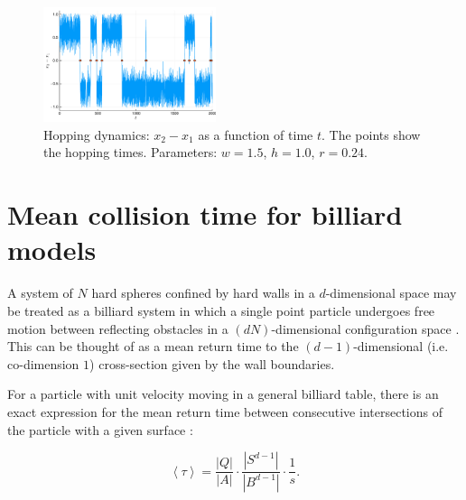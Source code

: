\documentclass[superscriptaddress,pre,reprint,showpacs,twocolumn]{revtex4-1}
\newcommand{\mean}[1]{\left \langle #1 \right \rangle}
\begin{document}
\begin{figure}[h]
  \begin{center}
    \includegraphics[width=0.45\textwidth]{figures/bistable.pdf}
  \end{center}
  \caption{Hopping dynamics: $x_2 - x_1$ as a function of time $t$. The points show the hopping times. Parameters:  $w = 1.5$, $h = 1.0$, $r = 0.24$.
  \label{fig:hopping-dynamics}  
    }
\end{figure}



\section{Mean collision time for billiard models}

\label{knownfacts}

A system of $N$ hard spheres confined by hard walls in a $d$-dimensional
space may be treated as a billiard system 
in which a single point particle undergoes free motion between reflecting obstacles 
in a $ (d N) $-dimensional configuration space \cite{Sinai70, Sim99, MarkChern}. 
This can be thought of as a mean return time to the $(d-1)$-dimensional 
(i.e. co-dimension $1$) cross-section given by the wall boundaries.

For a particle with unit velocity moving in a general billiard table, there is 
an exact expression for the mean return time between consecutive
intersections of the particle with a given surface \cite{Chernov97}:

\begin{equation}\label{meanfreetime}
 \mean{\tau} = \frac{|Q|}{|A|} \cdot \frac{|S^{d-1}|} {|B^{d-1}|} \cdot \frac{1}{s}.
\end{equation}
\end{document}

